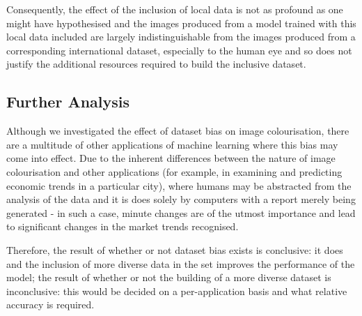 \documentclass[conference]{IEEEtran}
\begin{document}
Consequently, the effect of the inclusion of local data is not as profound as one might have hypothesised and the images produced from a model trained with this local data included are largely indistinguishable from the images produced from a corresponding international dataset, especially to the human eye and so does not justify the additional resources required to build the inclusive dataset.

\subsection{Further Analysis}

Although we investigated the effect of dataset bias on image colourisation, there are a multitude of other applications of machine learning where this bias may come into effect. Due to the inherent differences between the nature of image colourisation and other applications (for example, in examining and predicting economic trends in a particular city), where humans may be abstracted from the analysis of the data and it is does solely by computers with a report merely being generated - in such a case, minute changes are of the utmost importance and lead to significant changes in the market trends recognised.

Therefore, the result of whether or not dataset bias exists is conclusive: it does and the inclusion of more diverse data in the set improves the performance of the model; the result of whether or not the building of a more diverse dataset is inconclusive: this would be decided on a per-application basis and what relative accuracy is required.

\medskip
 




\end{document}
